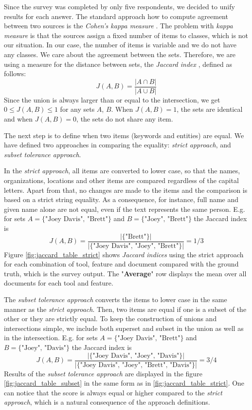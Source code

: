 \documentclass[
  digital, %
  table,   %
  lof,     %
  lot,     %
]{fithesis3}
\begin{document}
Since the survey was completed by only five respondents, we decided to unify results for each answer.
The standard approach how to compute agreement between two sources is the \textit{Cohen's kappa measure} \cite{smeeton1985kappa}.
The problem with \textit{kappa measure} is that the sources assign a fixed number of items to classes, which is not our situation.
In our case, the number of items is variable and we do not have any classes.
We care about the agreement between the sets.
Therefore, we are using a measure for the distance between sets, the \textit{Jaccard index} \cite{levandowsky1971distance}, defined as follows:
$$
J(A, B) = \frac{|A \cap B|}{|A \cup B|}
$$
Since the union is always larger than or equal to the intersection, we get $0 \leq J(A, B) \leq 1$ for any sets $A$, $B$. 
When $J(A,B)=1$, the sets are identical and when $J(A,B)=0$, the sets do not share any item.

The next step is to define when two items (keywords and entities) are equal.
We have defined two approaches in comparing the equality: \textit{strict approach}, and \textit{subset tolerance approach}.

In the \textit{strict approach}, all items are converted to lower case, so that the names, organizations, locations and other items are compared regardless of the capital letters.
Apart from that, no changes are made to the items and the comparison is based on a strict string equality.
As a consequence, for instance, full name and given name alone are not equal, even if the text represents the same person. 
E.g. for sets $A=\{\text{"Joey Davis", "Brett"}\}$ and $B=\{\text{"Joey", "Brett"}\}$ the Jaccard index is 
$$
J(A, B) = \frac{|\{\text{"Brett"}\}|}{|\{\text{"Joey Davis", "Joey", "Brett"}\}|} = 1/3
$$
Figure \ref{fig:jaccard_table_strict} shows \textit{Jaccard indices} using the strict approach for each combination of tool, feature and document compared with the ground truth, which is the survey output.
The "\textbf{Average}" row displays the mean over all documents for each tool and feature.

The \textit{subset tolerance approach} converts the items to lower case in the same manner as the \textit{strict approach}.
Then, two items are equal if one is a subset of the other or they are strictly equal.
To keep the construction of unions and intersections simple, we include both superset and subset in the union as well as in the intersection.
E.g. for sets $A=\{\text{"Joey Davis", "Brett"}\}$ and $B=\{\text{"Joey", "Davis"}\}$ the Jaccard index is 
$$
J(A, B) = \frac{|\{\text{"Joey Davis", "Joey", "Davis"}\}|}{|\{\text{"Joey Davis", "Joey", "Brett", "Davis"}\}|} = 3/4
$$
Results of the \textit{subset tolerance approach} are displayed in the figure \ref{fig:jaccard_table_subset} in the same form as in \ref{fig:jaccard_table_strict}.
One can notice that the score is always equal or higher compared to the \textit{strict approach}, which is a natural consequence of the approach definitions.
\end{document}
